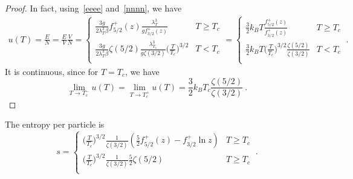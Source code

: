     \begin{proof}
        In fact, using~\eqref{eeee} and~\eqref{nnnn}, we have 
        \begin{equation*}
        \begin{aligned}
            u(T) = \frac{E}{N} = \frac{E}{V} \frac{V}{N} = \begin{cases}
                \frac{3 g}{2 \lambda_T^3 \beta} f^+_{5/2} (z)  \frac{\lambda_T^3}{g f^+_{3/2} (z)} & T \geq T_c \\
                \frac{3 g}{2 \lambda_T^3 \beta} \zeta(5/2) \frac{\lambda_{T_c}^3}{g \zeta(3/2)} \Big ( \frac{T}{T_c} \Big )^{3/2} & T < T_c \\
            \end{cases} = \begin{cases}
                \frac{3}{2} k_B T \frac{f^+_{5/2} (z)}{f^+_{3/2} (z)} & T \geq T_c \\
                \frac{3}{2} k_B T \Big ( \frac{T}{T_c} \Big)^{3/2} \frac{\zeta(5/2)}{\zeta(3/2)} & T < T_c \\
            \end{cases} ~.
        \end{aligned}
        \end{equation*}
        It is continuous, since for $T = T_c$, we have
        \begin{equation*}
            \lim_{T \rightarrow T_c^-} u(T) = \lim_{T \rightarrow T_c^+} u(T) = \frac{3}{2} k_B T_c \frac{\zeta(5/2)}{\zeta(3/2)} ~.
        \end{equation*}
    \end{proof}
    The entropy per particle is 
    \begin{equation*}
        s = \begin{cases}
            \Big ( \frac{T}{T_c} \Big)^{3/2} \frac{1}{\zeta(3/2)} (\frac{5}{2} f^+_{5/2} (z) - f^+_{3/2} \ln z) & T \geq T_c \\
            \Big ( \frac{T}{T_c} \Big)^{3/2} \frac{1}{\zeta (3/2)} \frac{5}{2} \zeta(5/2)  & T \geq T_c \\
        \end{cases} ~.
    \end{equation*}
